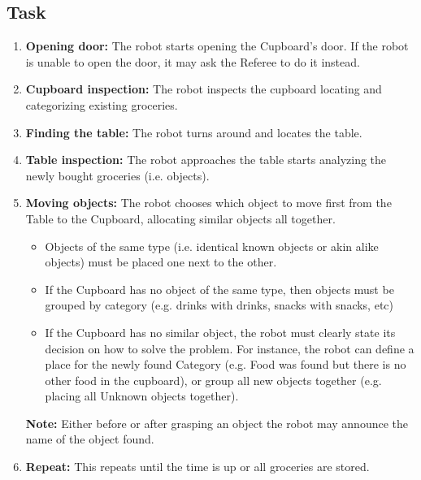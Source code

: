 \subsection{Task}
\begin{enumerate}
	\item \textbf{Opening door:} The robot starts opening the Cupboard's door. If the robot is unable to open the door, it may ask the Referee to do it instead.
	\item \textbf{Cupboard inspection:} The robot inspects the cupboard locating and categorizing existing groceries.
	\item \textbf{Finding the table:} The robot turns around and locates the table.  
	\item \textbf{Table inspection:} The robot approaches the table starts analyzing the newly bought groceries (i.e. objects).
	\item \textbf{Moving objects:} The robot chooses which object to move first from the Table to the Cupboard, allocating similar objects all together.
	\begin{itemize}
		\item Objects of the same type (i.e. identical known objects or akin alike objects) must be placed one next to the other.
		\item If the Cupboard has no object of the same type, then objects must be grouped by category (e.g. drinks with drinks, snacks with snacks, etc)
		\item If the Cupboard has no similar object, the robot must clearly state its decision on how to solve the problem. For instance, the robot can define a place for the newly found Category (e.g. Food was found but there is no other food in the cupboard), or group all new objects together (e.g. placing all Unknown objects together).
	\end{itemize}

	\textbf{Note:} Either before or after grasping an object the robot may announce the name of the object found. 
	\item \textbf{Repeat:} This repeats until the time is up or all groceries are stored.
\end{enumerate}

